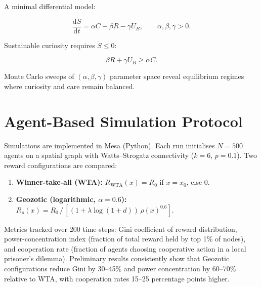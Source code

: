 \documentclass[12pt,a4paper]{article}
\theoremstyle{definition}
\newcommand{\ddt}[1]{\frac{\mathrm{d}#1}{\mathrm{d}t}}
\begin{document}
A minimal differential model:

\begin{equation}
  \ddt{S} = \alpha C - \beta R - \gamma U_B,
  \qquad \alpha, \beta, \gamma > 0.
  \label{eq:subsidy_model}
\end{equation}

Sustainable curiosity requires $\dot{S} \leq 0$:

\begin{equation}
  \beta R + \gamma U_B \geq \alpha C.
\end{equation}

Monte Carlo sweeps of $(\alpha, \beta, \gamma)$ parameter space reveal
equilibrium regimes where curiosity and care remain balanced.

\section{Agent-Based Simulation Protocol}
\label{app:agentbased}

Simulations are implemented in Mesa (Python).  Each run initialises $N = 500$
agents on a spatial graph with Watts--Strogatz connectivity ($k = 6$,
$p = 0.1$).  Two reward configurations are compared:

\begin{enumerate}[leftmargin=*]
  \item \textbf{Winner-take-all (WTA):} $R_{\mathrm{WTA}}(x) = R_0$ if
    $x = x_0$, else $0$.
  \item \textbf{Geozotic (logarithmic, $\alpha = 0.6$):}
    $R_\rho(x) = R_0\,/\,[(1 + \lambda \log(1+d))\,\rho(x)^{0.6}]$.
\end{enumerate}

Metrics tracked over 200 time-steps: Gini coefficient of reward distribution,
power-concentration index (fraction of total reward held by top 1\% of nodes),
and cooperation rate (fraction of agents choosing cooperative action in a
local prisoner's dilemma).  Preliminary results consistently show that
Geozotic configurations reduce Gini by 30--45\% and power concentration by
60--70\% relative to WTA, with cooperation rates 15--25 percentage points
higher.
\end{document}
